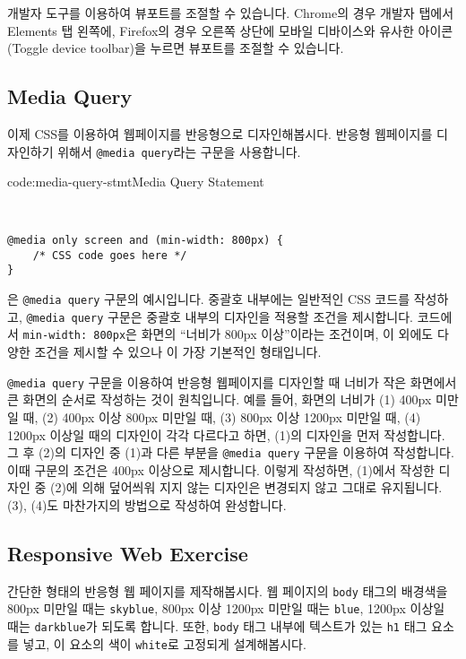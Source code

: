 개발자 도구를 이용하여 뷰포트를 조절할 수 있습니다. Chrome의 경우 개발자 탭에서 Elements 탭 왼쪽에, Firefox의 경우 오른쪽 상단에 모바일 디바이스와 유사한 아이콘(Toggle device toolbar)을 누르면 뷰포트를 조절할 수 있습니다. 

\subsection*{Media Query}
이제 CSS를 이용하여 웹페이지를 반응형으로 디자인해봅시다. 반응형 웹페이지를 디자인하기 위해서 \verb|@media query|라는 구문을 사용합니다. 

\begin{codeenv}{code:media-query-stmt}{Media Query Statement}\begin{verbatim}


@media only screen and (min-width: 800px) {
    /* CSS code goes here */   
}
\end{verbatim}
\end{codeenv}

은 \verb|@media query| 구문의 예시입니다. 중괄호 내부에는 일반적인 CSS 코드를 작성하고, \verb|@media query| 구문은 중괄호 내부의 디자인을 적용할 조건을 제시합니다. 코드에서 \verb|min-width: 800px|은 화면의 ``너비가 800px 이상''이라는 조건이며, 이 외에도 다양한 조건을 제시할 수 있으나 이 가장 기본적인 형태입니다. 

\verb|@media query| 구문을 이용하여 반응형 웹페이지를 디자인할 때 너비가 작은 화면에서 큰 화면의 순서로 작성하는 것이 원칙입니다. 예를 들어, 화면의 너비가 (1) 400px 미만일 때, (2) 400px 이상 800px 미만일 때, (3) 800px 이상 1200px 미만일 때, (4) 1200px 이상일 때의 디자인이 각각 다르다고 하면, (1)의 디자인을 먼저 작성합니다. 그 후 (2)의 디자인 중 (1)과 다른 부분을 \verb|@media query| 구문을 이용하여 작성합니다. 이때 구문의 조건은 400px 이상으로 제시합니다. 이렇게 작성하면, (1)에서 작성한 디자인 중 (2)에 의해 덮어씌워 지지 않는 디자인은 변경되지 않고 그대로 유지됩니다. (3), (4)도 마찬가지의 방법으로 작성하여 완성합니다. 

\subsection*{Responsive Web Exercise}
간단한 형태의 반응형 웹 페이지를 제작해봅시다. 웹 페이지의 \verb|body| 태그의 배경색을 800px 미만일 때는 \verb|skyblue|, 800px 이상 1200px 미만일 때는 \verb|blue|, 1200px 이상일 때는 \verb|darkblue|가 되도록 합니다. 또한, \verb|body| 태그 내부에 텍스트가 있는 \verb|h1| 태그 요소를 넣고, 이 요소의 색이 \verb|white|로 고정되게 설계해봅시다. 

